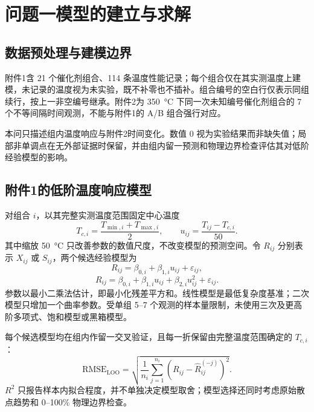 \section{问题一模型的建立与求解}

\subsection{数据预处理与建模边界}

附件1含 21 个催化剂组合、114 条温度性能记录；每个组合仅在其实测温度上建模，未记录的温度视为未实验，既不补零也不插补。组合编号的空白行仅表示同组续行，按上一非空编号继承。附件2为 \SI{350}{\degreeCelsius} 下同一次未知编号催化剂组合的 7 个不等间隔时间观测，不能与附件1的 A/B 组合强行对应。

本问只描述组内温度响应与附件2时间变化。数值 0 视为实验结果而非缺失值；局部非单调点在无外部证据时保留，并由组内留一预测和物理边界检查评估其对低阶经验模型的影响。

\subsection{附件1的低阶温度响应模型}

对组合 $i$，以其完整实测温度范围固定中心温度
\begin{equation}
  T_{c,i}=\frac{T_{\min,i}+T_{\max,i}}{2},\qquad
  u_{ij}=\frac{T_{ij}-T_{c,i}}{50}.
\end{equation}
其中缩放 \SI{50}{\degreeCelsius} 只改善参数的数值尺度，不改变模型的预测空间。令 $R_{ij}$ 分别表示 $X_{ij}$ 或 $S_{ij}$，两个候选经验模型为
\begin{equation}
  R_{ij}=\beta_{0,i}+\beta_{1,i}u_{ij}+\varepsilon_{ij},
  \label{eq:q1-linear}
\end{equation}
\begin{equation}
  R_{ij}=\beta_{0,i}+\beta_{1,i}u_{ij}+\beta_{2,i}u_{ij}^2+\varepsilon_{ij}.
  \label{eq:q1-quadratic}
\end{equation}
参数以最小二乘法估计，即最小化残差平方和。线性模型是最低复杂度基准；二次模型只增加一个曲率参数。受单组 5--7 个观测的样本量限制，未使用三次及更高阶多项式、饱和模型或黑箱模型。

每个候选模型均在组内作留一交叉验证，且每一折保留由完整温度范围确定的 $T_{c,i}$：
\begin{equation}
  \mathrm{RMSE}_{\mathrm{LOO}}
  =\sqrt{\frac{1}{n_i}\sum_{j=1}^{n_i}\left(R_{ij}-\widehat R^{(-j)}_{ij}\right)^2}.
  \label{eq:q1-loocv}
\end{equation}
$R^2$ 只报告样本内拟合程度，并不单独决定模型取舍；模型选择还同时考虑原始散点趋势和 0--100\% 物理边界检查。

